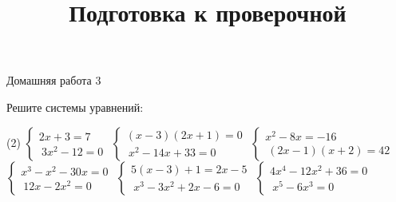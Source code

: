 \begin{homework}[number=3]
	\begin{listofex}
		\item Домашняя работа 3
	\end{listofex}
\end{homework}

\begin{class}[number=7]
	\title{Подготовка к проверочной}
	\begin{listofex}
		\item  Решите системы уравнений:
		\begin{tasks}(2)
			\task \( \begin{cases}
				2x+3=7 \\\ 3x^{2}-12=0
			\end{cases} \)
			\task \( \begin{cases}
				(x-3)(2x+1)=0 \\\ x^{2}-14x+33=0
			\end{cases} \)
			\task \( \begin{cases}
				x^{2}-8x=-16 \\\ (2x-1)(x+2)=42
			\end{cases} \)
			\task \( \begin{cases}
				x^{3}-x^{2}-30x=0\\\ 12x-2x^{2}=0
			\end{cases} \)
			\task \( \begin{cases}
				5(x-3)+1=2x-5\\\ x^{3}-3x^{2}+2x -6=0
			\end{cases} \)
			\task \( \begin{cases}
				4x^{4}-12x^{2}+36=0\\\ x^{5}-6x^{3}=0
			\end{cases} \)
		\end{tasks}
	\end{listofex}
\end{class}


